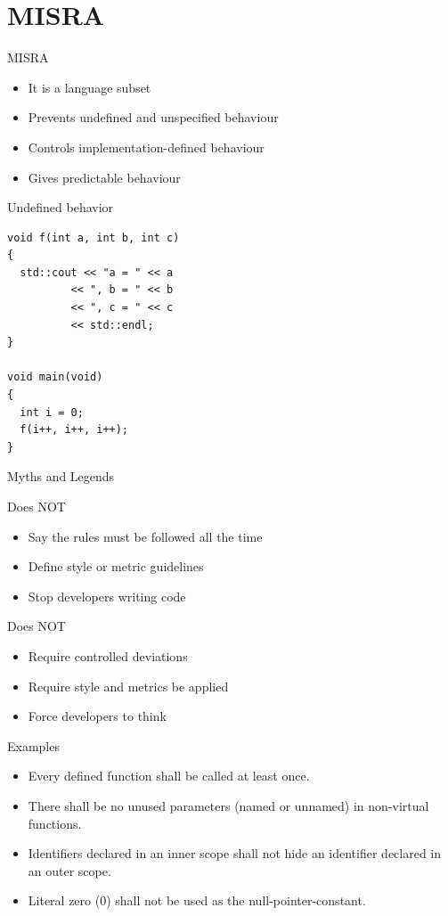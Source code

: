 \documentclass{beamer}
\begin{document}
\section{MISRA}
\begin{frame}{MISRA}
\begin{itemize}
  \item It is a language subset
  \item Prevents undefined and unspecified behaviour
  \item Controls implementation-defined behaviour
  \item Gives predictable behaviour
\end{itemize}
\end{frame}

\begin{frame}[fragile]{Undefined behavior}
\begin{lstlisting}
void f(int a, int b, int c)
{ 
  std::cout << "a = " << a 
          << ", b = " << b 
          << ", c = " << c 
          << std::endl; 
}

void main(void)
{
  int i = 0;  
  f(i++, i++, i++); 
}
\end{lstlisting}
\end{frame}

\begin{frame}{Myths and Legends}
\begin{block}{Does NOT}
\begin{itemize}
  \item Say the rules must be followed all the time
  \item Define style or metric guidelines
  \item Stop developers writing code
\end{itemize}
\end{block}
\begin{block}{Does NOT}
\begin{itemize}
  \item Require controlled deviations
  \item Require style and metrics be applied
  \item Force developers to think
\end{itemize}
\end{block}
\end{frame}


\begin{frame}{Examples}
\begin{itemize}
  \item Every defined function shall be called at least once.
  \item There shall be no unused parameters (named or unnamed) in non-virtual
  functions.
  \item Identifiers declared in an inner scope shall not hide an identifier
  declared in an outer scope.
  \item Literal zero (0) shall not be used as the null-pointer-constant.
\end{itemize}
\end{frame}
\end{document}
